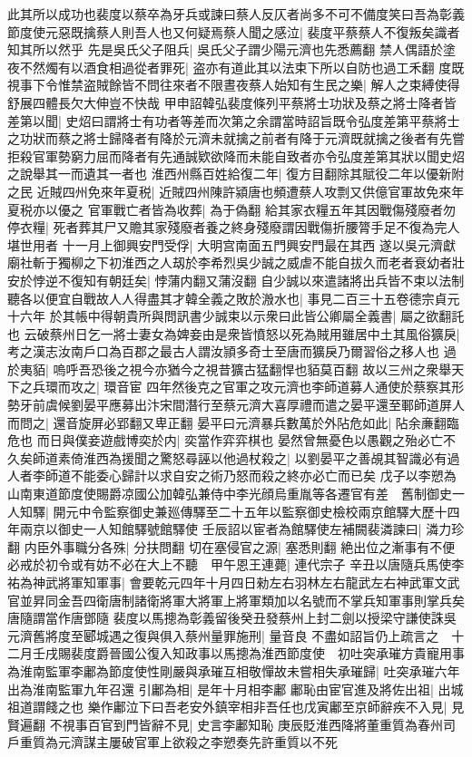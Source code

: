 此其所以成功也裴度以蔡卒為牙兵或諫曰蔡人反仄者尚多不可不備度笑曰吾為彰義節度使元惡既擒蔡人則吾人也又何疑焉蔡人聞之感泣|{
	裴度平蔡蔡人不復叛矣識者知其所以然乎}
先是吳氏父子阻兵|{
	吳氏父子謂少陽元濟也先悉薦翻}
禁人偶語於塗夜不然燭有以酒食相過從者罪死|{
	盗亦有道此其以法束下所以自防也過工禾翻}
度既視事下令惟禁盗賊餘皆不問往來者不限晝夜蔡人始知有生民之樂|{
	解人之束縛使得舒展四體長欠大伸豈不快哉}
甲申詔韓弘裴度條列平蔡將士功狀及蔡之將士降者皆差第以聞|{
	史炤曰謂將士有功者等差而次第之余謂當時詔旨既令弘度差第平蔡將士之功狀而蔡之將士歸降者有降於元濟未就擒之前者有降于元濟既就擒之後者有先嘗拒殺官軍勢窮力屈而降者有先通誠欵欲降而未能自致者亦令弘度差第其狀以聞史炤之說舉其一而遺其一者也}
淮西州縣百姓給復二年|{
	復方目翻除其賦役二年以優新附之民}
近賊四州免來年夏税|{
	近賊四州陳許潁唐也頻遭蔡人攻剽又供億官軍故免來年夏税亦以優之}
官軍戰亡者皆為收葬|{
	為于偽翻}
給其家衣糧五年其因戰傷殘廢者勿停衣糧|{
	死者葬其尸又贍其家殘廢者養之終身殘廢謂因戰傷折腰膂手足不復為完人堪世用者}
十一月上御興安門受俘|{
	大明宫南面五門興安門最在其西}
遂以吳元濟獻廟社斬于獨柳之下初淮西之人刼於李希烈吳少誠之威虐不能自拔久而老者衰幼者壯安於悖逆不復知有朝廷矣|{
	悖蒲内翻又蒲沒翻}
自少誠以來遣諸將出兵皆不束以法制聽各以便宜自戰故人人得盡其才韓全義之敗於溵水也|{
	事見二百三十五卷德宗貞元十六年}
於其帳中得朝貴所與問訊書少誠束以示衆曰此皆公卿屬全義書|{
	屬之欲翻託也}
云破蔡州日乞一將士妻女為婢妾由是衆皆憤怒以死為賊用雖居中土其風俗獷戾|{
	考之漢志汝南戶口為百郡之最古人謂汝頴多奇士至唐而獷戾乃爾習俗之移人也}
過於夷貊|{
	嗚呼吾恐後之視今亦猶今之視昔獷古猛翻悍也貊莫百翻}
故以三州之衆舉天下之兵環而攻之|{
	環音宦}
四年然後克之官軍之攻元濟也李師道募人通使於蔡察其形勢牙前虞候劉晏平應募出汴宋間潛行至蔡元濟大喜厚禮而遣之晏平還至鄆師道屏人而問之|{
	還音旋屏必郢翻又卑正翻}
晏平曰元濟暴兵數萬於外阽危如此|{
	阽余亷翻臨危也}
而日與僕妾遊戲博奕於内|{
	奕當作弈弈棋也}
晏然曾無憂色以愚觀之殆必亡不久矣師道素倚淮西為援聞之驚怒尋誣以他過杖殺之|{
	以劉晏平之善覘其智識必有過人者李師道不能委心歸計以求自安之術乃怒而殺之終亦必亡而已矣}
戊子以李愬為山南東道節度使賜爵凉國公加韓弘兼侍中李光顔烏重胤等各遷官有差　舊制御史一人知驛|{
	開元中令監察御史兼廵傳驛至二十五年以監察御史檢校兩京館驛大歷十四年兩京以御史一人知館驛號館驛使}
壬辰詔以宦者為館驛使左補闕裴潾諫曰|{
	潾力珍翻}
内臣外事職分各殊|{
	分扶問翻}
切在塞侵官之源|{
	塞悉則翻}
絶出位之漸事有不便必戒於初令或有妨不必在大上不聽　甲午恩王連薨|{
	連代宗子}
辛丑以唐隨兵馬使李祐為神武將軍知軍事|{
	會要乾元四年十月四日勑左右羽林左右龍武左右神武軍文武官並昇同金吾四衛唐制諸衛將軍大將軍上將軍類加以名號而不掌兵知軍事則掌兵矣唐隨謂當作唐鄧隨}
裴度以馬摠為彰義留後癸丑發蔡州上封二劍以授梁守謙使誅吳元濟舊將度至郾城遇之復與俱入蔡州量罪施刑|{
	量音良}
不盡如詔旨仍上疏言之　十二月壬戌賜裴度爵晉國公復入知政事以馬摠為淮西節度使　初吐突承璀方貴寵用事為淮南監軍李鄘為節度使性剛嚴與承璀互相敬憚故未嘗相失承璀歸|{
	吐突承璀六年出為淮南監軍九年召還}
引鄘為相|{
	是年十月相李鄘}
鄘恥由宦官進及將佐出祖|{
	出城祖道謂餞之也}
樂作鄘泣下曰吾老安外鎮宰相非吾任也戊寅鄘至京師辭疾不入見|{
	見賢遍翻}
不視事百官到門皆辭不見|{
	史言李鄘知恥}
庚辰貶淮西降將董重質為春州司戶重質為元濟謀主屢破官軍上欲殺之李愬奏先許重質以不死

